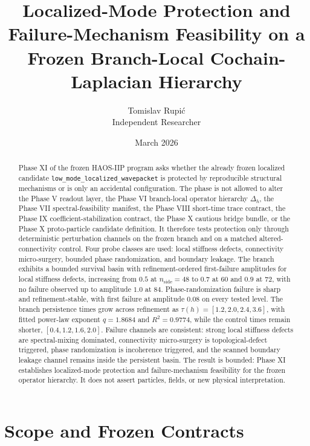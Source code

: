\documentclass[11pt]{article}
\title{Localized-Mode Protection and Failure-Mechanism Feasibility on a Frozen Branch-Local Cochain-Laplacian Hierarchy}
\author{Tomislav Rupi\'c \\ Independent Researcher}
\date{March 2026}
\begin{document}
\maketitle

\begin{abstract}
Phase XI of the frozen HAOS-IIP program asks whether the already frozen localized candidate
\texttt{low\_mode\_localized\_wavepacket} is protected by reproducible structural mechanisms or is only an accidental configuration. The phase is not allowed to alter the Phase V readout layer, the Phase VI branch-local operator hierarchy $\Delta_h$, the Phase VII spectral-feasibility manifest, the Phase VIII short-time trace contract, the Phase IX coefficient-stabilization contract, the Phase X cautious bridge bundle, or the Phase X proto-particle candidate definition. It therefore tests protection only through deterministic perturbation channels on the frozen branch and on a matched altered-connectivity control. Four probe classes are used: local stiffness defects, connectivity micro-surgery, bounded phase randomization, and boundary leakage. The branch exhibits a bounded survival basin with refinement-ordered first-failure amplitudes for local stiffness defects, increasing from $0.5$ at $n_{\mathrm{side}}=48$ to $0.7$ at $60$ and $0.9$ at $72$, with no failure observed up to amplitude $1.0$ at $84$. Phase-randomization failure is sharp and refinement-stable, with first failure at amplitude $0.08$ on every tested level. The branch persistence times grow across refinement as $\tau(h) = [1.2, 2.0, 2.4, 3.6]$, with fitted power-law exponent $q = 1.8684$ and $R^2 = 0.9774$, while the control times remain shorter, $[0.4,1.2,1.6,2.0]$. Failure channels are consistent: strong local stiffness defects are spectral-mixing dominated, connectivity micro-surgery is topological-defect triggered, phase randomization is incoherence triggered, and the scanned boundary leakage channel remains inside the persistent basin. The result is bounded: Phase XI establishes localized-mode protection and failure-mechanism feasibility for the frozen operator hierarchy. It does not assert particles, fields, or new physical interpretation.
\end{abstract}

\section{Scope and Frozen Contracts}
\end{document}
